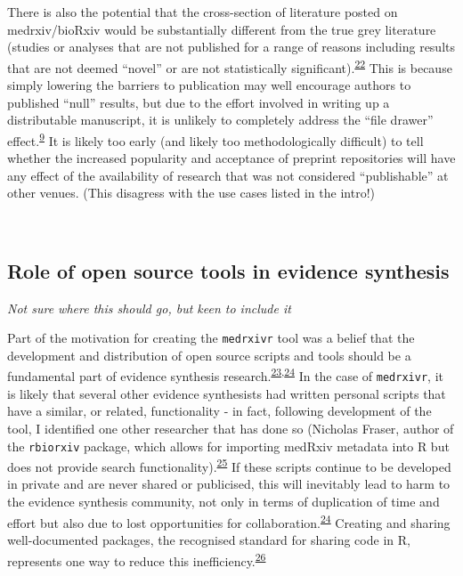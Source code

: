 \documentclass[a4paper, twoside]{templates/ociamthesis}
\begin{document}
There is also the potential that the cross-section of literature posted on medrxiv/bioRxiv would be substantially different from the true grey literature (studies or analyses that are not published for a range of reasons including results that are not deemed ``novel'' or are not statistically significant).\textsuperscript{\protect\hyperlink{ref-song2010}{22}} This is because simply lowering the barriers to publication may well encourage authors to published ``null'' results, but due to the effort involved in writing up a distributable manuscript, it is unlikely to completely address the ``file drawer'' effect.\textsuperscript{\protect\hyperlink{ref-rosenthal1979}{9}} It is likely too early (and likely too methodologically difficult) to tell whether the increased popularity and acceptance of preprint repositories will have any effect of the availability of research that was not considered ``publishable'' at other venues. (This disagress with the use cases listed in the intro!)

~

\hypertarget{role-of-open-source-tools-in-evidence-synthesis}{%
\subsection{Role of open source tools in evidence synthesis}\label{role-of-open-source-tools-in-evidence-synthesis}}

\emph{Not sure where this should go, but keen to include it}

Part of the motivation for creating the \texttt{medrxivr} tool was a belief that the development and distribution of open source scripts and tools should be a fundamental part of evidence synthesis research.\textsuperscript{\protect\hyperlink{ref-goldacre2019b}{23},\protect\hyperlink{ref-mckiernan2016c}{24}} In the case of \texttt{medrxivr}, it is likely that several other evidence synthesists had written personal scripts that have a similar, or related, functionality - in fact, following development of the tool, I identified one other researcher that has done so (Nicholas Fraser, author of the \texttt{rbiorxiv} package, which allows for importing medRxiv metadata into R but does not provide search functionality).\textsuperscript{\protect\hyperlink{ref-rbiorxiv}{25}} If these scripts continue to be developed in private and are never shared or publicised, this will inevitably lead to harm to the evidence synthesis community, not only in terms of duplication of time and effort but also due to lost opportunities for collaboration.\textsuperscript{\protect\hyperlink{ref-mckiernan2016c}{24}} Creating and sharing well-documented packages, the recognised standard for sharing code in R, represents one way to reduce this inefficiency.\textsuperscript{\protect\hyperlink{ref-vuorre2020}{26}}
\end{document}

